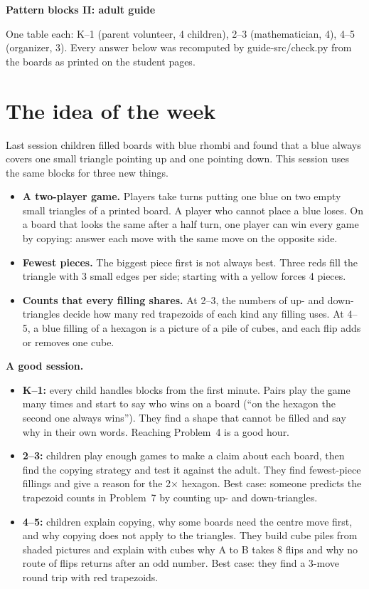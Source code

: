 \documentclass[10pt]{article}
\begin{document}
{\Large\bfseries Pattern blocks II: adult guide}\par
\smallskip
One table each: K--1 (parent volunteer, 4 children), 2--3 (mathematician, 4), 4--5 (organizer, 3). Every answer below was recomputed by guide-src/check.py from the boards as printed on the student pages.

\section{The idea of the week}

Last session children filled boards with blue rhombi and found that a blue always covers one small triangle pointing up and one pointing down. This session uses the same blocks for three new things.
\begin{itemize}
\item \textbf{A two-player game.} Players take turns putting one blue on two empty small triangles of a printed board. A player who cannot place a blue loses. On a board that looks the same after a half turn, one player can win every game by copying: answer each move with the same move on the opposite side.
\item \textbf{Fewest pieces.} The biggest piece first is not always best. Three reds fill the triangle with 3 small edges per side; starting with a yellow forces 4 pieces.
\item \textbf{Counts that every filling shares.} At 2--3, the numbers of up- and down-triangles decide how many red trapezoids of each kind any filling uses. At 4--5, a blue filling of a hexagon is a picture of a pile of cubes, and each flip adds or removes one cube.
\end{itemize}

\textbf{A good session.}
\begin{itemize}
\item \textbf{K--1:} every child handles blocks from the first minute. Pairs play the game many times and start to say who wins on a board (``on the hexagon the second one always wins''). They find a shape that cannot be filled and say why in their own words. Reaching Problem~4 is a good hour.
\item \textbf{2--3:} children play enough games to make a claim about each board, then find the copying strategy and test it against the adult. They find fewest-piece fillings and give a reason for the 2$\times$ hexagon. Best case: someone predicts the trapezoid counts in Problem~7 by counting up- and down-triangles.
\item \textbf{4--5:} children explain copying, why some boards need the centre move first, and why copying does not apply to the triangles. They build cube piles from shaded pictures and explain with cubes why A to B takes 8 flips and why no route of flips returns after an odd number. Best case: they find a 3-move round trip with red trapezoids.
\end{itemize}
\end{document}
